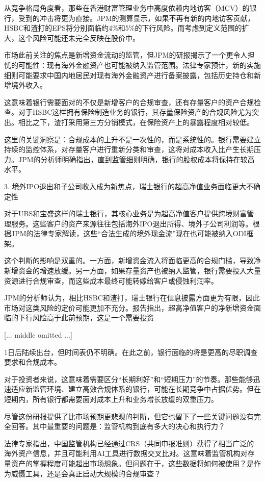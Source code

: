 \documentclass[11pt]{ctexart}
\begin{document}
从竞争格局角度看，那些在香港财富管理业务中高度依赖内地访客（MCV）的银行，受到的冲击将更为直接。JPM的测算显示，如果不再有新的内地访客贡献，HSBC和渣打的EPS将分别面临约4\%和5\%的下行风险。而考虑到定义范围的扩大，这个风险可能还未完全反映在股价中。

市场此前关注的焦点是新增资金流动的监管，但JPM的研报揭示了一个更令人担忧的可能性：现有海外金融资产也可能被纳入监管范围。法律专家预计，新的实施细则可能要求中国内地居民对现有海外金融资产进行备案披露，包括历史持仓和新增境外收入。

这意味着银行需要面对的不仅是新增客户的合规审查，还有存量客户的资产合规检查。对于HSBC这样拥有保险制造业务的银行，其存量保险资产的合规风险尤为突出。相比之下，渣打采用第三方分销模式，在保险资产上的暴露程度相对较低。

这里的关键洞察是：合规成本的上升不是一次性的，而是系统性的。银行需要建立持续的监控体系，对存量客户进行重新分类和审查，这将对成本收入比产生长期压力。JPM的分析师明确指出，直到监管细则明确，银行的股权成本将保持在较高水平。

3. 境外IPO退出和子公司收入成为新焦点，瑞士银行的超高净值业务面临更大不确定性

对于UBS和宝盛这样的瑞士银行，其核心业务是为超高净值客户提供跨境财富管理服务。这些客户的资产来源往往包括海外IPO退出所得、境外子公司利润等。根据JPM的法律专家解读，这些“合法生成的境外现金流”现在也可能被纳入ODI框架。

这个判断的影响是双重的。一方面，新增资金流入将面临更高的合规门槛，导致净新增资金的增速放缓。另一方面，如果存量资产也被纳入监管，银行需要投入大量资源进行合规审查，而这些成本最终可能转嫁给客户或侵蚀利润率。

JPM的分析师认为，相比HSBC和渣打，瑞士银行在信息披露方面更为有限，因此市场对这类风险的定价可能更加不充分。报告指出，超高净值客户的净新增资金面临的下行风险高于此前预期，这是一个需要投资

[... middle omitted ...]

1日后陆续出台，但时间表仍不明确。在此之前，银行面临的将是更高的尽职调查要求和合规成本。

对于投资者来说，这意味着需要区分“长期利好”和“短期压力”的节奏。那些能够迅速适应新监管环境、建立高效合规体系的银行，可能在长期竞争中占据优势。但在短期内，所有银行都需要面对成本上升和业务增长放缓的双重压力。

尽管这份研报提供了比市场预期更悲观的判断，但它也留下了一些关键问题没有完全回答。其中最重要的问题是：监管机构到底有多大的决心和执行力？

法律专家指出，中国监管机构已经通过CRS（共同申报准则）获得了相当广泛的海外资产信息，并且可能利用AI工具进行数据交叉比对。这意味着监管机构对存量资产的掌握程度可能超出市场想象。但问题在于，这些数据将如何被使用？是作为威慑工具，还是会真正启动大规模的合规审查？
\end{document}
